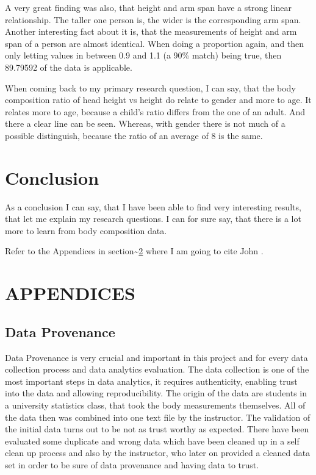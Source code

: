 \documentclass[]{article}
\begin{document}
A very great finding was also, that height and arm span have a strong
linear relationship. The taller one person is, the wider is the
corresponding arm span. Another interesting fact about it is, that the
measurements of height and arm span of a person are almost identical.
When doing a proportion again, and then only letting values in between
0.9 and 1.1 (a 90\% match) being true, then 89.79592 of the data is
applicable.

When coming back to my primary research question, I can say, that the
body composition ratio of head height vs height do relate to gender and
more to age. It relates more to age, because a child's ratio differs
from the one of an adult. And there a clear line can be seen. Whereas,
with gender there is not much of a possible distinguish, because the
ratio of an average of 8 is the same.

\section{Conclusion}
\label{sec:conclusion}

As a conclusion I can say, that I have been able to find very
interesting results, that let me explain my research questions. I can
for sure say, that there is a lot more to learn from body composition
data.

Refer to the Appendices in section\textasciitilde{}\ref{sec:appendix}
where I am going to cite John \citep[pp. 2-3]{Tukey:1962}.

\newpage



\newpage

\newpage
\section{APPENDICES}
\label{sec:appendix}

\subsection{Data Provenance}
\label{sec:appendix-data-provenance}

Data Provenance is very crucial and important in this project and for
every data collection process and data analytics evaluation. The data
collection is one of the most important steps in data analytics, it
requires authenticity, enabling trust into the data and allowing
reproducibility. The origin of the data are students in a university
statistics class, that took the body measurements themselves. All of the
data then was combined into one text file by the instructor. The
validation of the initial data turns out to be not as trust worthy as
expected. There have been evaluated some duplicate and wrong data which
have been cleaned up in a self clean up process and also by the
instructor, who later on provided a cleaned data set in order to be sure
of data provenance and having data to trust.
\end{document}
